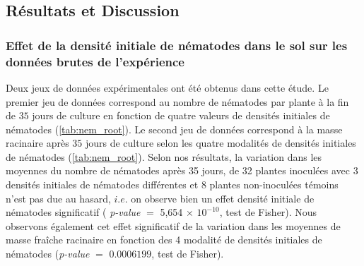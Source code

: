 	
	
\subsection{Résultats et Discussion} \label{sec:résultats-chapitre4}
	
	
	
\subsubsection{Effet de la densité initiale de nématodes dans le sol sur les données brutes de l'expérience}
	
	Deux jeux de données expérimentales ont été obtenus dans cette étude. Le premier jeu de données correspond  au nombre de nématodes par  plante à la fin de $35$ jours de culture en fonction de quatre valeurs de densités  initiales de nématodes (\autoref{tab:nem_root}). Le second jeu de données correspond à la   masse racinaire  après $35$ jours de culture selon les quatre modalités de  densités initiales de nématodes (\autoref{tab:nem_root}).  Selon nos résultats, la variation dans les moyennes du nombre de nématodes  après 35 jours, de 32 plantes inoculées avec 3 densités initiales de nématodes différentes et 8 plantes non-inoculées témoins n'est pas due au hasard, $i.e.$ on observe bien un \og effet densité initiale de nématodes significatif \fg{}  ( \textit{p-value} $=$ 5,654 $\times$ $10^{-10}$, test de Fisher). Nous observons également cet effet significatif de la variation dans les moyennes  de masse fraîche racinaire en fonction des 4 modalité de densités initiales de nématodes (\textit{p-value} $=$ $0.0006199$, test de Fisher).
	
